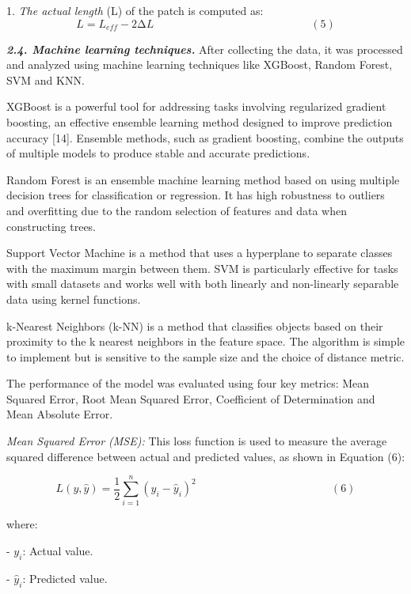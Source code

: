 \begin{multicols}{2}
\setcounter{enumi}{3}

1. \emph{The actual length} (L) of the patch is computed as:
\[L = L_{eff} - 2\mathrm{\Delta}L\ \ \ \ \ \ \ \ \ \ \ \ \ \ \ \ \ \ \ \ \ \ \ \ \ \ \ \ \ \ \ \ \ \ \ \ \ \ \ \ \ \ \ \ \ \ \ \ \ \ \ \ \ \ \ \ \ \ \ \ \ \ \ \ (5)\]

\emph{{\bfseries 2.4. Machine learning techniques.}} After collecting the
data, it was processed and analyzed using machine learning techniques
like XGBoost, Random Forest, SVM and KNN.

XGBoost is a powerful tool for addressing tasks involving regularized
gradient boosting, an effective ensemble learning method designed to
improve prediction accuracy {[}14{]}. Ensemble methods, such as gradient
boosting, combine the outputs of multiple models to produce stable and
accurate predictions.

Random Forest is an ensemble machine learning method based on using
multiple decision trees for classification or regression. It has high
robustness to outliers and overfitting due to the random selection of
features and data when constructing trees.

Support Vector Machine is a method that uses a hyperplane to separate
classes with the maximum margin between them. SVM is particularly
effective for tasks with small datasets and works well with both
linearly and non-linearly separable data using kernel functions.

k-Nearest Neighbors (k-NN) is a method that classifies objects based on
their proximity to the k nearest neighbors in the feature space. The
algorithm is simple to implement but is sensitive to the sample size and
the choice of distance metric.

The performance of the model was evaluated using four key metrics: Mean
Squared Error, Root Mean Squared Error, Coefficient of Determination and
Mean Absolute Error.

\emph{Mean Squared Error (MSE):} This loss function is used to measure
the average squared difference between actual and predicted values, as
shown in Equation (6):

\[L\left( y,\widehat{y} \right) = \frac{1}{2}\sum_{i = 1}^{n}{{(y_{i} - {\widehat{y}}_{i})}^{2}\ }\ \ \ \ \ \ \ \ \ \ \ \ \ \ \ \ \ \ \ \ \ \ \ \ \ \ \ \ \ \ \ \ \ \ \ \ \ \ \ \ \ \ \ \ \ \ \ \ \ \ \ \ \ \ (6)\]

where:


- \(y_{i}\): Actual value.

- \({\widehat{y}}_{i}\)\hspace{0pt}: Predicted value.


\end{multicols}
